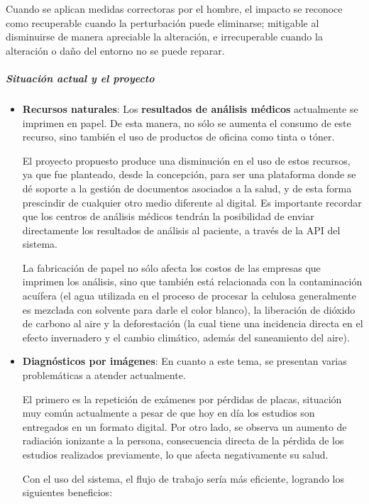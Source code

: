 Cuando  se  aplican  medidas  correctoras  por  el  hombre,  el  impacto  se  reconoce  como recuperable cuando la perturbación puede eliminarse; mitigable al disminuirse de manera apreciable la alteración, e irrecuperable cuando la alteración o daño del entorno no se puede reparar.


\subparagraph{Situación actual y el proyecto}

\begin{itemize}
    
    \item \textbf{Recursos naturales}:
    Los \textbf{resultados de análisis médicos} actualmente se imprimen en papel.
    De esta manera, no sólo se aumenta el consumo de este recurso, sino también el uso de productos de oficina como tinta o tóner.
    
    El proyecto propuesto produce una disminución en el uso de estos recursos, ya que fue planteado, desde la concepción, para ser una plataforma donde se dé soporte a la gestión de documentos asociados a la salud, y de esta forma prescindir de cualquier otro medio diferente al digital.
    Es importante recordar que los centros de análisis médicos tendrán la posibilidad de enviar directamente los resultados de análisis al paciente, a través de la API del sistema.

    La fabricación de papel no sólo afecta los costos de las empresas que imprimen los análisis, sino que también está relacionada con la contaminación acuífera (el agua utilizada en el proceso de procesar la celulosa generalmente es mezclada con solvente para darle el color blanco), la liberación de dióxido de carbono al aire y la deforestación (la cual tiene una incidencia directa en el efecto invernadero y el cambio climático, además del saneamiento del aire).

    \item \textbf{Diagnósticos por imágenes}:
    En cuanto a este tema, se presentan varias problemáticas a atender actualmente.
    
    El primero es la repetición de exámenes por pérdidas de placas, situación muy común actualmente a pesar de que hoy en día los estudios son entregados en un formato digital.
    Por otro lado, se observa un aumento de radiación ionizante a la persona, consecuencia directa de la pérdida de los estudios realizados previamente, lo que afecta negativamente su salud.
    
    Con el uso del sistema, el flujo de trabajo sería más eficiente, logrando los siguientes beneficios:
    

\end{itemize}
